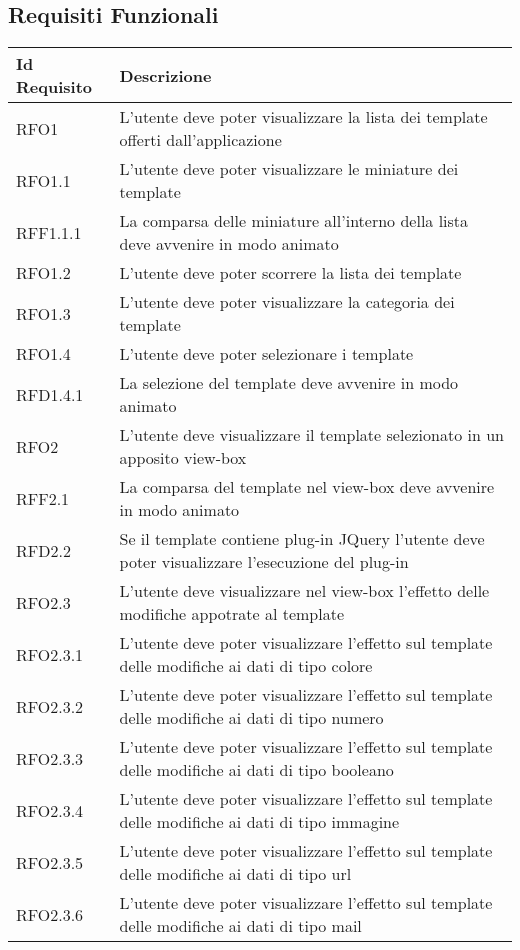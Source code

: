 \subsection{Requisiti Funzionali}
\normalsize
\begin{longtable}{|l|m{11cm}|}
\hline
\textbf{Id Requisito} & \textbf{Descrizione}\\
\hline
\endhead
RFO1 & L'utente deve poter visualizzare la lista dei template offerti dall'applicazione \\ \hline
RFO1.1 & L'utente deve poter visualizzare le miniature dei template \\ \hline
RFF1.1.1 & La comparsa delle miniature all'interno della lista deve avvenire in modo animato \\ \hline
RFO1.2 & L'utente deve poter scorrere la lista dei template \\ \hline
RFO1.3 & L'utente deve poter visualizzare la categoria dei template \\ \hline
RFO1.4 & L'utente deve poter selezionare i template \\ \hline
RFD1.4.1 & La selezione del template deve avvenire in modo animato \\ \hline
RFO2 & L'utente deve visualizzare il template selezionato in un apposito view-box \\ \hline
RFF2.1 & La comparsa del template nel view-box deve avvenire in modo animato \\ \hline
RFD2.2 & Se il template contiene plug-in JQuery l'utente deve poter visualizzare l'esecuzione del plug-in \\ \hline
RFO2.3 & L'utente deve visualizzare nel view-box l'effetto delle modifiche appotrate al template \\ \hline
RFO2.3.1 & L'utente deve poter visualizzare l'effetto sul template delle modifiche ai dati di tipo colore \\ \hline
RFO2.3.2 & L'utente deve poter visualizzare l'effetto sul template delle modifiche ai dati di tipo numero \\ \hline
RFO2.3.3 & L'utente deve poter visualizzare l'effetto sul template delle modifiche ai dati di tipo booleano \\ \hline
RFO2.3.4 & L'utente deve poter visualizzare l'effetto sul template delle modifiche ai dati di tipo immagine \\ \hline
RFO2.3.5 & L'utente deve poter visualizzare l'effetto sul template delle modifiche ai dati di tipo url \\ \hline
RFO2.3.6 & L'utente deve poter visualizzare l'effetto sul template delle modifiche ai dati di tipo mail\\ \hline

\end{longtable}
